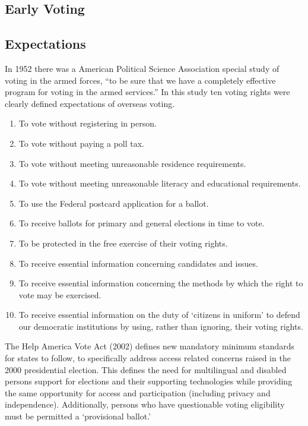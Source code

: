 \begin{center}
\end{center}
\subsection{Early Voting}
\subsection{Expectations}

In 1952 there was a American Political Science Association special study of voting in the armed forces, ``to be sure that we have a completely effective program for voting in the armed services.'' In this study ten voting rights were clearly defined expectations of overseas voting.

\begin{enumerate}
  \item To vote without registering in person.
  \item To vote without paying a poll tax.
  \item To vote without meeting unreasonable residence requirements.
  \item To vote without meeting unreasonable literacy and educational requirements.
  \item To use the Federal postcard application for a ballot.
  \item To receive ballots for primary and general elections in time to vote.
  \item To be protected in the free exercise of their voting rights.
  \item To receive essential information concerning candidates and issues.
  \item To receive essential information concerning the methods by which the right to vote may be exercised.
  \item To receive essential information on the duty of `citizens in uniform' to defend our democratic institutions by using, rather than ignoring, their voting rights.
\end{enumerate}

The Help America Vote Act (2002) defines new mandatory minimum standards for states to follow, to specifically address access related concerns raised in the 2000 presidential election. This defines the need for multilingual and disabled persons support for elections and their supporting technologies while providing the same opportunity for access and participation (including privacy and independence). Additionally, persons who have questionable voting eligibility must be permitted a `provisional ballot.' 

